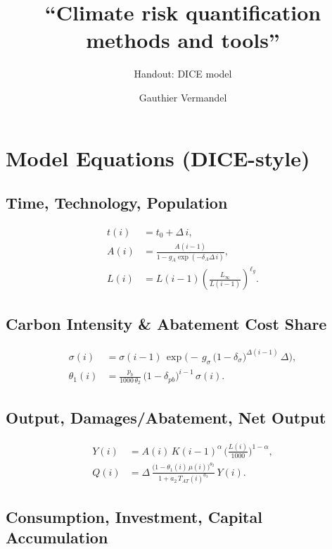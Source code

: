 \documentclass[11pt]{scrartcl}%
\subtitle{Handout: DICE model}
\theoremstyle{mytheoremstyle}
\theoremstyle{plain}
\begin{document}
\title{``Climate risk quantification methods and tools'' }
\author{Gauthier Vermandel}
\date{}
\maketitle

\section{Model Equations (DICE-style)}

\subsection*{Time, Technology, Population}%

\begin{align}
t(i)  & = t_{0} + \Delta\, i,\\
A(i)  & = \frac{A(i-1)}{1 - g_{A} \exp(-\delta_{A} \Delta\, i)},\\
L(i)  & = L(i-1)\left( \frac{L_{\infty}}{L(i-1)}\right) ^{\ell_{g}}.
\end{align}


\subsection*{Carbon Intensity \& Abatement Cost Share}%

\begin{align}
\sigma(i)  & = \sigma(i-1)\,\exp\!\Big(-\,g_{\sigma}\,\big(1-\delta_{\sigma
}\big)^{\Delta(i-1)}\,\Delta\Big),\\
\theta_{1}(i)  & = \frac{p_{b}}{1000\,\theta_{2}}\,\big(1-\delta
_{pb}\big)^{i-1}\,\sigma(i).
\end{align}


\subsection*{Output, Damages/Abatement, Net Output}%

\begin{align}
Y(i)  & = A(i)\,K(i-1)^{\alpha}\,\Big(\tfrac{L(i)}{1000}\Big)^{1-\alpha},\\
Q(i)  & = \Delta\,\frac{\big(1-\theta_{1}(i)\,\mu(i)\big)^{\theta_{2}}}{1 +
a_{2}\,T_{AT}(i)^{a_{3}}}\,Y(i).
\end{align}


\subsection*{Consumption, Investment, Capital Accumulation}%
\end{document}
